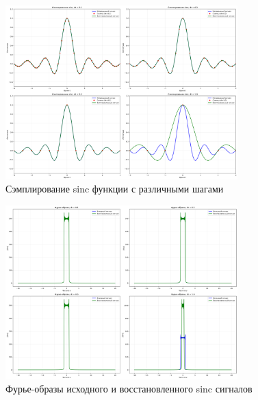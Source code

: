 \begin{figure}[H]
    \centering
    \includegraphics[width=0.8\textwidth]{images/task2/sampling_sinc.png}
    \caption{Сэмплирование sinc функции с различными шагами}
    \label{fig:sampling_sinc}
\end{figure}

\begin{figure}[H]
    \centering
    \includegraphics[width=0.8\textwidth]{images/task2/sampling_sinc_fourier.png}
    \caption{Фурье-образы исходного и восстановленного sinc сигналов}
    \label{fig:sampling_sinc_fourier}
\end{figure}


